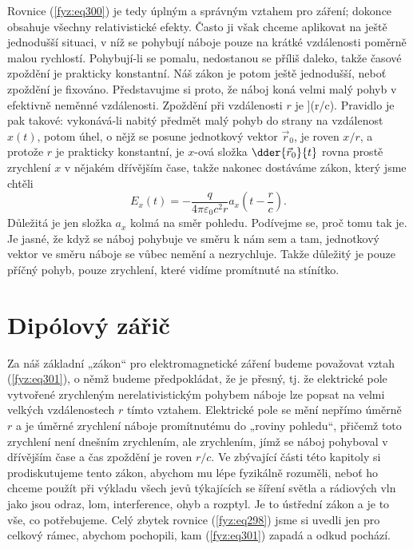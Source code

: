     Rovnice (\ref{fyz:eq300}) je tedy úplným a správným vztahem pro záření; dokonce obsahuje 
    všechny relativistické efekty. Často ji však chceme aplikovat na ještě jednodušší situaci, v 
    níž se pohybují náboje pouze na krátké vzdálenosti poměrně malou rychlostí. Pohybují-li se 
    pomalu, nedostanou se příliš daleko, takže časové zpoždění je prakticky konstantní. Náš zákon 
    je potom ještě jednodušší, neboť zpoždění je fixováno. Představujme si proto, že náboj koná 
    velmi malý pohyb v efektivně neměnné vzdálenosti. Zpoždění při vzdálenosti \(r\) je ](r/c). 
    Pravidlo je pak takové: vykonává-li nabitý předmět malý pohyb do strany na vzdálenost \(x(t)\), 
    potom úhel, o nějž se posune jednotkový vektor \(\vec{r}_0\), je roven \(x/r\), a protože \(r\) 
    je prakticky konstantní, je \(x\)-ová složka \(\dder{\vec{r}_0}{t}\) rovna prostě zrychlení 
    \(x\) v nějakém dřívějším čase, takže nakonec dostáváme zákon, který jsme chtěli
    \begin{equation}\label{fyz:eq301}
      E_x(t) = -\frac{q}{4\pi\varepsilon_0c^2r}a_x\left(t-\frac{r}{c}\right).
    \end{equation}
    Důležitá je jen složka \(a_x\) kolmá na směr pohledu. Podívejme se, proč tomu tak je. Je jasné, 
    že když se náboj pohybuje ve směru k nám sem a tam, jednotkový vektor ve směru náboje se
    vůbec nemění a nezrychluje. Takže důležitý je pouze příčný pohyb, pouze zrychlení, které vidíme 
    promítnuté na stínítko.
    
  \section{Dipólový zářič}\label{fyz:IchapXXVIIIsecIII}
    Za náš základní „zákon“ pro elektromagnetické záření budeme považovat vztah (\ref{fyz:eq301}), 
    o němž budeme předpokládat, že je přesný, tj. že elektrické pole vytvořené zrychleným 
    nerelativistickým pohybem náboje lze popsat na velmi velkých vzdálenostech \(r\) tímto vztahem. 
    Elektrické pole se mění nepřímo úměrně \(r\) a je úměrné zrychlení náboje promítnutému do 
    „roviny pohledu“, přičemž toto zrychlení není dnešním zrychlením, ale zrychlením, jímž se náboj 
    pohyboval v dřívějším čase a čas zpoždění je roven \(r/c\). Ve zbývající části této kapitoly si 
    prodiskutujeme tento zákon, abychom mu lépe fyzikálně rozuměli, neboť ho chceme použít při 
    výkladu všech jevů týkajících se šíření světla a rádiových vln jako jsou odraz, lom, 
    interference, ohyb a rozptyl. Je to ústřední zákon a je to vše, co potřebujeme. Celý zbytek 
    rovnice (\ref{fyz:eq298}) jsme si uvedli jen pro celkový rámec, abychom pochopili, kam 
    (\ref{fyz:eq301}) zapadá a odkud pochází. 

